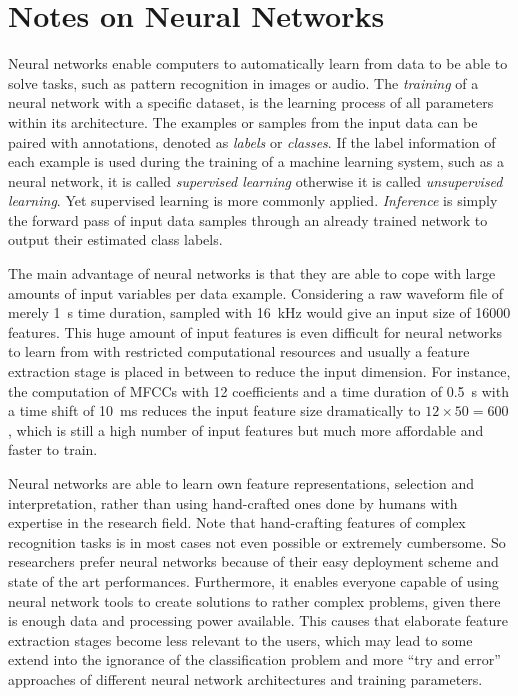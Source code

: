 
\section{Notes on Neural Networks}\label{sec:intro_nn}
Neural networks enable computers to automatically learn from data to be able to solve tasks, such as pattern recognition in images or audio.
The \emph{training} of a neural network with a specific dataset, is the learning process of all parameters within its architecture.
The examples or samples from the input data can be paired with annotations, denoted as \emph{labels} or \emph{classes}.
If the label information of each example is used during the training of a machine learning system, such as a neural network, it is called \emph{supervised learning} otherwise it is called \emph{unsupervised learning}.
Yet supervised learning is more commonly applied.
\emph{Inference} is simply the forward pass of input data samples through an already trained network to output their estimated class labels.

The main advantage of neural networks is that they are able to cope with large amounts of input variables per data example.
Considering a raw waveform file of merely \SI{1}{s} time duration, sampled with \SI{16}{\kilo\hertz} would give an input size of 16000 features.
This huge amount of input features is even difficult for neural networks to learn from with restricted computational resources and usually a feature extraction stage is placed in between to reduce the input dimension.
For instance, the computation of MFCCs with 12 coefficients and a time duration of \SI{0.5}{s} with a time shift of \SI{10}{\milli\second} reduces the input feature size dramatically to $12 \times 50 = 600$, which is still a high number of input features but much more affordable and faster to train.

Neural networks are able to learn own feature representations, selection and interpretation, rather than using hand-crafted ones done by humans with expertise in the research field.
Note that hand-crafting features of complex recognition tasks is in most cases not even possible or extremely cumbersome.
So researchers prefer neural networks because of their easy deployment scheme and state of the art performances.
Furthermore, it enables everyone capable of using neural network tools to create solutions to rather complex problems, given there is enough data and processing power available.
This causes that elaborate feature extraction stages become less relevant to the users, which may lead to some extend into the ignorance of the classification problem and more \enquote{try and error} approaches of different neural network architectures and training parameters.


